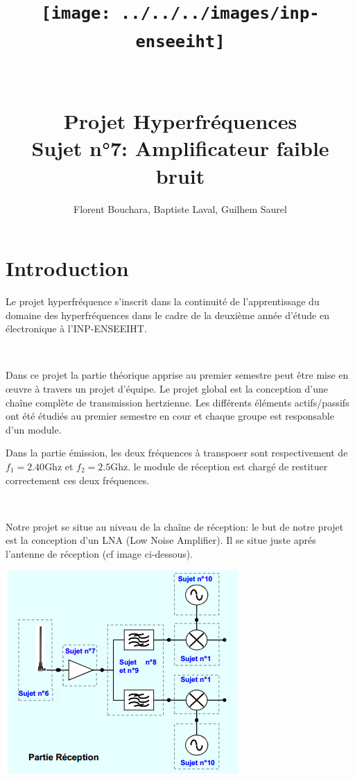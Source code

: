 \documentclass[12pt]{article}
\title{\texttt{[image: ../../../images/inp-enseeiht]}  \\ ~ \\ ~ \\ Projet Hyperfréquences \\
Sujet n°7: Amplificateur faible bruit}
\author{Florent Bouchara, Baptiste Laval, Guilhem Saurel}
\date{\oldstylenums{\today}}
\begin{document}
\begin{titlepage}
    \setcounter{page}{0}
    \maketitle
    \tableofcontents
    \thispagestyle{empty}
\end{titlepage}

\section{Introduction}

Le projet hyperfréquence s'inscrit dans la continuité de l'apprentissage du domaine des hyperfréquences dans le cadre de la deuxième année d'étude en électronique à l'INP-ENSEEIHT.

~

Dans ce projet la partie théorique apprise au premier semestre peut être mise en œuvre à travers un projet d'équipe. Le projet global est la conception d'une chaîne complète de transmission hertzienne. Les différents éléments actifs/passifs ont été étudiés au premier semestre en cour et chaque groupe est responsable d'un module. 

Dans la partie émission, les deux fréquences à transposer sont respectivement de $f_1=2.40 $Ghz et $f_2=2.5 $Ghz. le module de réception est chargé de restituer correctement ces deux fréquences. 

~

Notre projet se situe au niveau de la chaîne de réception: le but de notre projet est la conception d'un LNA (Low Noise Amplifier). Il se situe juste aprés l'antenne de réception (cf image ci-dessous).

\begin{center}
\includegraphics[width=\linewidth]{img/reception}
\end{center}
\end{document}
